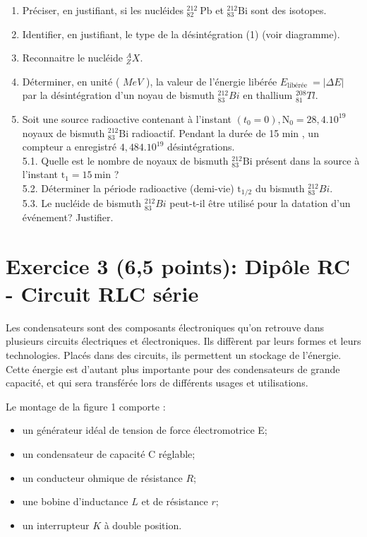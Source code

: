 \begin{enumerate}
  \item Préciser, en justifiant, si les nucléides ${ }_{82}^{212} \mathrm{~Pb}$ et ${ }_{83}^{212} \mathrm{Bi}$ sont des isotopes.
  \item Identifier, en justifiant, le type de la désintégration (1) (voir diagramme).
  \item Reconnaitre le nucléide ${ }_{Z}^{A} X$.
  \item Déterminer, en unité ( $M e V$ ), la valeur de l'énergie libérée $E_{\text {libérée }}=|\Delta E|$ par la désintégration d'un noyau de bismuth ${ }_{83}^{212} B i$ en thallium ${ }_{81}^{208} T l$.
  \item Soit une source radioactive contenant à l'instant $\left(t_{0}=0\right), \mathrm{N}_{0}=28,4.10^{19}$ noyaux de bismuth ${ }_{83}^{212} \mathrm{Bi}$ radioactif. Pendant la durée de 15 min , un compteur a enregistré $4,484.10^{19}$ désintégrations.\\
5.1. Quelle est le nombre de noyaux de bismuth ${ }_{83}^{212} \mathrm{Bi}$ présent dans la source à l'instant $\mathrm{t}_{1}=15 \mathrm{~min}$ ?\\
5.2. Déterminer la période radioactive (demi-vie) $\mathrm{t}_{1 / 2}$ du bismuth ${ }_{83}^{212} B i$.\\
5.3. Le nucléide de bismuth ${ }_{83}^{212} B i$ peut-t-il être utilisé pour la datation d'un événement? Justifier.
\end{enumerate}

\section*{Exercice 3 (6,5 points): Dipôle RC - Circuit RLC série}
Les condensateurs sont des composants électroniques qu'on retrouve dans plusieurs circuits électriques et électroniques. Ils diffèrent par leurs formes et leurs technologies. Placés dans des circuits, ils permettent un stockage de l'énergie. Cette énergie est d'autant plus importante pour des condensateurs de grande capacité, et qui sera transférée lors de différents usages et utilisations.

Le montage de la figure 1 comporte :

\begin{itemize}
  \item un générateur idéal de tension de force électromotrice E;
  \item un condensateur de capacité C réglable;
  \item un conducteur ohmique de résistance $R$;
  \item une bobine d'inductance $L$ et de résistance $r$;
  \item un interrupteur $K$ à double position.
\end{itemize}

